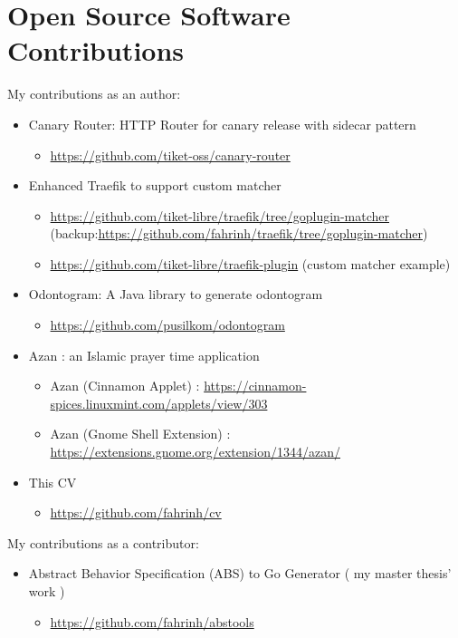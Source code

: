 \documentclass[11pt,a4paper,sans]{moderncv} %
\begin{document}
\section{Open Source Software Contributions}
{
My contributions as an author:
\begin{itemize}
    \item Canary Router: HTTP Router for canary release with sidecar pattern
      \begin{itemize}
        \item \url{https://github.com/tiket-oss/canary-router}
      \end{itemize}
    \item Enhanced Traefik to support custom matcher
      \begin{itemize}
        \item \url{https://github.com/tiket-libre/traefik/tree/goplugin-matcher} (backup:\url{https://github.com/fahrinh/traefik/tree/goplugin-matcher})
        \item \url{https://github.com/tiket-libre/traefik-plugin} (custom matcher example)
      \end{itemize}
    \item Odontogram: A Java library to generate odontogram
      \begin{itemize}
        \item \url{https://github.com/pusilkom/odontogram}
      \end{itemize}
    \item Azan : an Islamic prayer time application
      \begin{itemize}
        \item Azan (Cinnamon Applet) : \url{https://cinnamon-spices.linuxmint.com/applets/view/303}
        \item Azan (Gnome Shell Extension) : \url{https://extensions.gnome.org/extension/1344/azan/}
      \end{itemize}
    \item This CV
      \begin{itemize}
        \item \url{https://github.com/fahrinh/cv}
      \end{itemize}
 \end{itemize}
}
{
My contributions as a contributor:
\begin{itemize}
    \item Abstract Behavior Specification (ABS) to Go Generator ( my master thesis' work )
    \begin{itemize}
        \item \url{https://github.com/fahrinh/abstools}
    \end{itemize}
\end{itemize}
}
\end{document}
